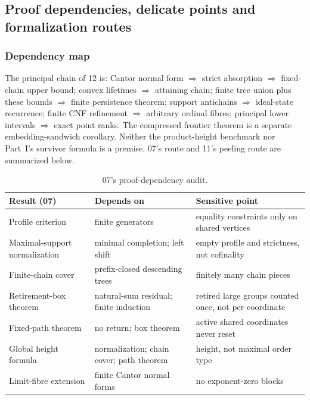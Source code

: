 \documentclass[11pt,a4paper]{article}
\theoremstyle{definition}
\theoremstyle{remark}
\begin{document}
\subsection{Proof dependencies, delicate points and formalization routes}
\label{nh:sec:audit}

\subsubsection{Dependency map}

The principal chain of 12 is: Cantor normal form $\Rightarrow$ strict absorption
$\Rightarrow$ fixed-chain upper bound; convex lifetimes $\Rightarrow$ attaining
chain; finite tree union plus these bounds $\Rightarrow$ finite persistence
theorem; support antichains $\Rightarrow$ ideal-state recurrence; finite CNF
refinement $\Rightarrow$ arbitrary ordinal fibres; principal lower intervals
$\Rightarrow$ exact point ranks. The compressed frontier theorem is a separate
embedding-sandwich corollary. Neither the product-height benchmark nor Part~I's
survivor formula is a premise. 07's route and 11's peeling route are summarized
below.

\begin{table}[htbp]
\centering\small
\begin{tabularx}{\textwidth}{@{}>{\raggedright\arraybackslash}p{}>{\raggedright\arraybackslash}X>{\raggedright\arraybackslash}X@{}}
\toprule
Result (07) & Depends on & Sensitive point\\
\midrule
Profile criterion & finite generators & equality constraints only on shared vertices\\
Maximal-support normalization & minimal completion; left shift & empty profile and strictness, not cofinality\\
Finite-chain cover & prefix-closed descending trees & finitely many chain pieces\\
Retirement-box theorem & natural-sum residual; finite induction & retired large groups counted once, not per coordinate\\
Fixed-path theorem & no return; box theorem & active shared coordinates never reset\\
Global height formula & normalization; chain cover; path theorem & height, not maximal order type\\
Limit-fibre extension & finite Cantor normal forms & no exponent-zero blocks\\
\bottomrule
\end{tabularx}
\caption{07's proof-dependency audit.}
\label{nh:tab:retireaudit}
\end{table}
\end{document}
